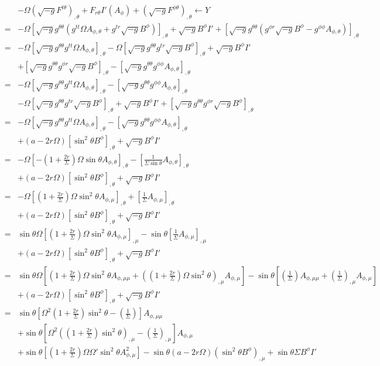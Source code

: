 \documentclass[aps,prd,preprint,groupedaddress]{revtex4-1}
\def\nn{\nonumber}
\def\beqn{\begin{eqnarray}}
\def\eeqn{\end{eqnarray}}
\def\st{\sin\theta}
\def\sst{\sin^2\theta}
\def\Ah{A_{\phi,\theta}}
\def\Am{A_{\phi,\mu}}
\def\Amm{A_{\phi,\mu\mu}}
\def\g{\sqrt{-g}}
\begin{document}
\beqn
&&-\Omega(\sqrt{-g}F^{t\theta})_{,\theta}+F_{r\theta}I'(A_\phi)
+(\sqrt{-g}F^{\phi\theta})_{,\theta} \leftarrow Y \nn\\
&=&
-\Omega\left[\sqrt{-g}g^{\theta\theta}(g^{tt}\Omega \Ah +g^{tr}\g B^\phi)  \right]_{,\theta} + \g B^\phi I'
+ \left[\g g^{\theta\theta}(g^{\phi r}\g B^\phi-g^{\phi\phi}\Ah)\right]_{,\theta}\nn\\
&=&
-\Omega\left[\g g^{\theta\theta}g^{tt}\Omega \Ah\right]_{,\theta}
-\Omega\left[\g g^{\theta\theta}g^{tr}\g B^\phi \right]_{,\theta}
+ \g B^\phi I'\nn\\
&&
+ \left[\g g^{\theta\theta}g^{\phi r}\g B^\phi\right]_{,\theta}
-\left[\g g^{\theta\theta} g^{\phi\phi}\Ah\right]_{,\theta}\nn \\
&=&
-\Omega\left[\g g^{\theta\theta}g^{tt}\Omega \Ah\right]_{,\theta}
-\left[\g g^{\theta\theta} g^{\phi\phi}\Ah\right]_{,\theta} \nn\\
&&
-\Omega\left[\g g^{\theta\theta}g^{tr}\g B^\phi \right]_{,\theta}
+ \g B^\phi I'
+ \left[\g g^{\theta\theta}g^{\phi r}\g B^\phi\right]_{,\theta}\nn\\
&=&
-\Omega\left[\g g^{\theta\theta}g^{tt}\Omega \Ah\right]_{,\theta}
-\left[\g g^{\theta\theta} g^{\phi\phi}\Ah\right]_{,\theta} \nn\\
&&
+(a-2r\Omega)\left[\sst B^\phi \right]_{,\theta}
+ \g B^\phi I' \nn\\
&=&
-\Omega\left[-(1+\frac{2r}{\Sigma})\Omega\st \Ah\right]_{,\theta}
-\left[\frac{1}{\Sigma\st}\Ah\right]_{,\theta} \nn\\
&&
+(a-2r\Omega)\left[\sst B^\phi \right]_{,\theta}
+ \g B^\phi I'\nn\\
&=&
-\Omega\left[(1+\frac{2r}{\Sigma})\Omega\sst\Am\right]_{,\theta}
+\left[\frac{1}{\Sigma}\Am\right]_{,\theta} \nn\\
&&
+(a-2r\Omega)\left[\sst B^\phi \right]_{,\theta}
+ \g B^\phi I' \nn\\
&=&
\st\Omega\left[(1+\frac{2r}{\Sigma})\Omega\sst\Am\right]_{,\mu}
-\st\left[\frac{1}{\Sigma}\Am\right]_{,\mu} \nn\\
&&
+(a-2r\Omega)\left[\sst B^\phi \right]_{,\theta}
+ \g B^\phi I' \nn\\
&=&
\st\Omega\left[(1+\frac{2r}{\Sigma})\Omega\sst\Amm + \left( (1+\frac{2r}{\Sigma})\Omega\sst \right)_{,\mu}\Am\right]
-\st\left[\left(\frac{1}{\Sigma}\right)\Amm + \left(\frac{1}{\Sigma}\right)_{,\mu} \Am \right] \nn\\
&&
+(a-2r\Omega)\left[\sst B^\phi \right]_{,\theta}
+ \g B^\phi I' \nn\\
&=&
\st\left[\Omega^2\left(1+\frac{2r}{\Sigma}\right)\sst-\left(\frac{1}{\Sigma}\right) \right]\Amm\nn\\
&&
+\st \left[ \Omega^2\left( (1+\frac{2r}{\Sigma})\sst \right)_{,\mu}-\left(\frac{1}{\Sigma}\right)_{,\mu}\right]\Am  \nn\\
&&
+\st\left[\left(1+\frac{2r}{\Sigma}\right)\Omega\Omega'\sst\Am^2 \right]
-\st(a-2r\Omega)\left(\sst B^\phi \right)_{,\mu}
+ \st\Sigma B^\phi I'
\eeqn
\end{document}
